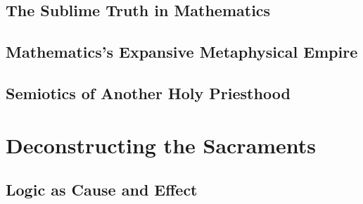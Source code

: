 \documentclass{article}
\begin{document}
	\subsection{The Sublime Truth in Mathematics}
	\subsection{Mathematics's Expansive Metaphysical Empire}
	\subsection{Semiotics of Another Holy Priesthood}
	\section{Deconstructing the Sacraments}
	\subsection{Logic as Cause and Effect}
	
	
\end{document}
